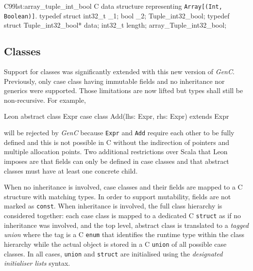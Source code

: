 \documentclass[a4paper,twoside]{article}
\newcommand{\Inline}[1]{\lstinline[basicstyle=\ttfamily]|#1|}
\newcommand{\InlineC}[1]{\lstinline[language=C99]|#1|}
\newcommand{\InlineS}[1]{\lstinline[language=Leon]|#1|}
\newcommand{\GenC}{\emph{GenC}\xspace}
\begin{document}
\begin{Code}{C99}{lst:array_tuple_int_bool}{%
C data structure representing \Inline{Array[(Int, Boolean)]}.}
typedef struct { int32_t _1; bool _2; } Tuple_int32_bool;
typedef struct { Tuple_int32_bool* data; int32_t length; }
        array_Tuple_int32_bool;
\end{Code}

\subsection{Classes}
\label{class}


Support for classes was significantly extended with this new version of \GenC.
Previously, only case class having immutable fields and no inheritance nor
generics were supported. Those limitations are now lifted but types shall still
be non-recursive. For example,
\begin{ShortCode}{Leon}
abstract class Expr
case class Add(lhs: Expr, rhs: Expr) extends Expr
\end{ShortCode}
will be rejected by \GenC because \InlineS{Expr} and \InlineS{Add} require each
other to be fully defined and this is not possible in C without the indirection
of pointers and multiple allocation points. Two additional restrictions over
Scala that Leon imposes are that fields can only be defined in case classes and
that abstract classes must have at least one concrete child.

When no inheritance is involved, case classes and their fields are mapped to a C
structure with matching types. In order to support mutability, fields are not
marked as \InlineC{const}. When inheritance is involved, the full class
hierarchy is considered together: each case class is mapped to a dedicated C
\InlineC{struct} as if no inheritance was involved, and the top level, abstract
class is translated to a \emph{tagged union} where the tag is a C \InlineC{enum}
that identifies the runtime type within the class hierarchy while the actual
object is stored in a C \InlineC{union} of all possible case classes. In all
cases, \InlineC{union} and \InlineC{struct} are initialised using the
\emph{designated initialiser lists} syntax.
\end{document}
